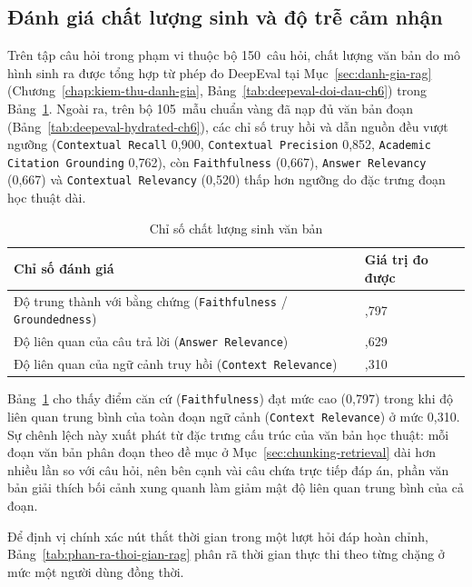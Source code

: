 \subsection{Đánh giá chất lượng sinh và độ trễ cảm nhận}
\label{subsec:danh-gia-chat-luong-sinh}

Trên tập câu hỏi trong phạm vi thuộc bộ 150~câu hỏi, chất lượng văn bản do mô hình sinh ra được tổng hợp từ phép đo DeepEval tại Mục~\ref{sec:danh-gia-rag} (Chương~\ref{chap:kiem-thu-danh-gia}, Bảng~\ref{tab:deepeval-doi-dau-ch6}) trong Bảng~\ref{tab:chat-luong-sinh}. Ngoài ra, trên bộ 105~mẫu chuẩn vàng đã nạp đủ văn bản đoạn (Bảng~\ref{tab:deepeval-hydrated-ch6}), các chỉ số truy hồi và dẫn nguồn đều vượt ngưỡng (\texttt{Contextual Recall} 0,900, \texttt{Contextual Precision} 0,852, \texttt{Academic Citation Grounding} 0,762), còn \texttt{Faithfulness} (0,667), \texttt{Answer Relevancy} (0,667) và \texttt{Contextual Relevancy} (0,520) thấp hơn ngưỡng do đặc trưng đoạn học thuật dài.

\begin{table}[htbp]
\centering
\caption{Chỉ số chất lượng sinh văn bản}
\label{tab:chat-luong-sinh}
\small
\begin{tabularx}{\textwidth}{
  >{\raggedright\arraybackslash}X
  >{\raggedleft\arraybackslash}p{3.5cm}
}
\toprule
\textbf{Chỉ số đánh giá} & \textbf{Giá trị đo được} \\
\midrule
Độ trung thành với bằng chứng (\texttt{Faithfulness} / \texttt{Groundedness}) & 0,797 \\
Độ liên quan của câu trả lời (\texttt{Answer Relevance}) & 0,629 \\
Độ liên quan của ngữ cảnh truy hồi (\texttt{Context Relevance}) & 0,310 \\
\bottomrule
\end{tabularx}
\end{table}

Bảng~\ref{tab:chat-luong-sinh} cho thấy điểm căn cứ (\texttt{Faithfulness}) đạt mức cao (0,797) trong khi độ liên quan trung bình của toàn đoạn ngữ cảnh (\texttt{Context Relevance}) ở mức 0,310. Sự chênh lệch này xuất phát từ đặc trưng cấu trúc của văn bản học thuật: mỗi đoạn văn bản phân đoạn theo đề mục ở Mục~\ref{sec:chunking-retrieval} dài hơn nhiều lần so với câu hỏi, nên bên cạnh vài câu chứa trực tiếp đáp án, phần văn bản giải thích bối cảnh xung quanh làm giảm mật độ liên quan trung bình của cả đoạn.

Để định vị chính xác nút thắt thời gian trong một lượt hỏi đáp hoàn chỉnh, Bảng~\ref{tab:phan-ra-thoi-gian-rag} phân rã thời gian thực thi theo từng chặng ở mức một người dùng đồng thời.

